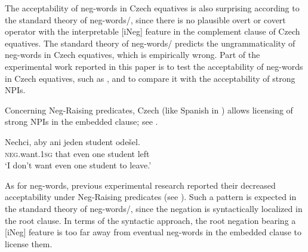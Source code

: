 \documentclass[output=paper,colorlinks,citecolor=brown]{langscibook}
\begin{document}
\noindent The acceptability of neg-words in Czech equatives is also surprising according to the standard theory of neg-words/\citet{zeijlstra2004sentential},  since there is no plausible overt or covert operator with the interpretable [iNeg] feature in the complement clause of Czech equatives. The standard theory of neg-words/\citet{zeijlstra2004sentential} predicts the ungrammaticality of neg-words in Czech equatives, which is empirically wrong. Part of the experimental work reported in this paper is to test the acceptability of neg-words in Czech equatives, such as , and to compare it with the acceptability of strong NPIs.


Concerning Neg-Raising predicates, Czech (like Spanish in ) allows licensing of strong NPIs in the embedded clause; see . 

\ea\label{ex-cz-nr} \gll Nechci, aby ani jeden student odešel.\\
\textsc{neg}.want.\textsc{1sg} that even one student left\\
\glt `I don't want even one student to leave.'
\z

\noindent As for neg-words, previous experimental research reported their decreased acceptability under Neg-Raising predicates (see \citealt{dovcekal2016experimentala}). Such a pattern is expected in the standard theory of neg-words/\citet{zeijlstra2004sentential}, since the negation is syntactically localized in the root clause. In terms of the syntactic approach, the root negation bearing a [iNeg] feature is too far away from eventual neg-words in the embedded clause to license them. 
\end{document}
